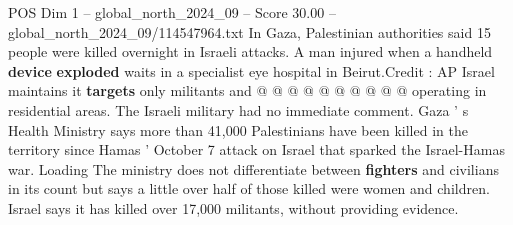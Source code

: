 \begin{textsample}{POS Dim 1 – global\_north\_2024\_09 – Score 30.00 – global\_north\_2024\_09/114547964.txt}
In Gaza, Palestinian authorities said 15 people were killed overnight in Israeli attacks.
A man injured when a handheld \textbf{device} \textbf{exploded} waits in a specialist eye hospital in Beirut.Credit : AP Israel maintains it \textbf{targets} only militants and @ @ @ @ @ @ @ @ @ @ operating in residential areas.
The Israeli military had no immediate comment.
Gaza ' s Health Ministry says more than 41,000 Palestinians have been killed in the territory since Hamas ' October 7 attack on Israel that sparked the Israel-Hamas war.
Loading The ministry does not differentiate between \textbf{fighters} and civilians in its count but says a little over half of those killed were women and children.
Israel says it has killed over 17,000 militants, without providing evidence.

\end{textsample}
